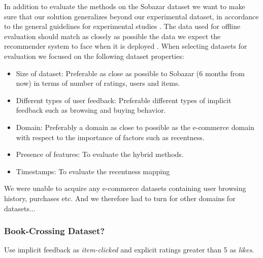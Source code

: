 In addition to evaluate the methods on the Sobazar dataset we want to make sure that our
solution generalizes beyond our experimental dataset, in accordance to the general guidelines
for experimental studies \cite{Shani2011}. The data used for offline evaluation should match
as closely as possible the data we expect the recommender system to face when it is
deployed \cite{Gunawardana2009}. When selecting datasets for evaluation we focused on the
following dataset properties:

\begin{itemize}
	\item Size of dataset: Preferable as close as possible to Sobazar (6 months from now)
	in terms of number of ratings, users and items.
	
	\item Different types of user feedback: Preferable different types of implicit feedback
	such as browsing and buying behavior.
	
	\item Domain: Preferably a domain as close to possible as the e-commerce domain with respect
	to the importance of factors such as recentness.
	
	\item Presence of features: To evaluate the hybrid methods.
	
	\item Timestamps: To evaluate the recentness mapping
\end{itemize}

We were unable to acquire any e-commerce datasets containing user browsing history, purchases etc.
And we therefore had to turn for other domains for datasets...


\subsubsection{Book-Crossing Dataset?}

Use implicit feedback as \emph{item-clicked} and explicit ratings greater than 5 as \emph{likes}.


